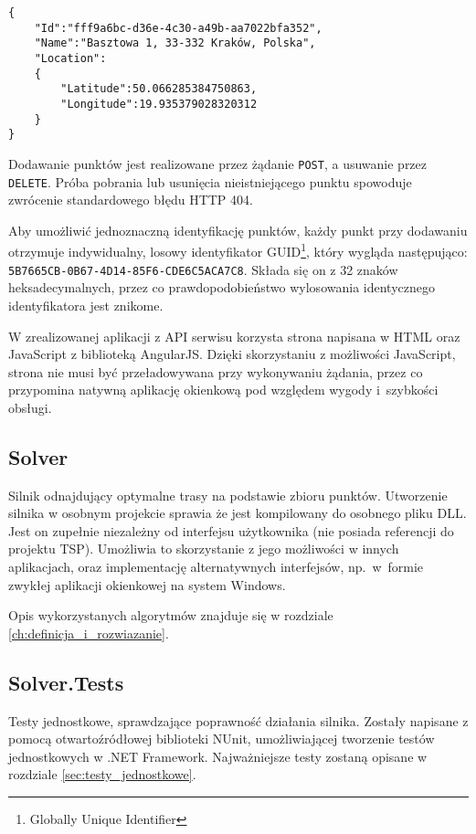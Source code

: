 \begin{verbatim}
{  
    "Id":"fff9a6bc-d36e-4c30-a49b-aa7022bfa352",
    "Name":"Basztowa 1, 33-332 Kraków, Polska",
    "Location": 
    {  
        "Latitude":50.066285384750863,
        "Longitude":19.935379028320312
    }
}
\end{verbatim}

Dodawanie punktów jest realizowane przez żądanie \texttt{POST}, a usuwanie przez \texttt{DELETE}. Próba pobrania lub usunięcia nieistniejącego punktu spowoduje zwrócenie standardowego błędu HTTP 404. 

Aby umożliwić jednoznaczną identyfikację punktów, każdy punkt przy dodawaniu otrzymuje indywidualny, losowy identyfikator GUID\footnote{Globally Unique Identifier}, który wygląda następująco: \texttt{5B7665CB-0B67-4D14-85F6-CDE6C5ACA7C8}. Składa się on z 32 znaków heksadecymalnych, przez co prawdopodobieństwo wylosowania identycznego identyfikatora jest znikome. 

W zrealizowanej aplikacji z API serwisu korzysta strona napisana w HTML oraz JavaScript z biblioteką AngularJS. Dzięki skorzystaniu z możliwości JavaScript, strona nie musi być przeładowywana przy wykonywaniu żądania, przez co przypomina natywną aplikację okienkową pod względem wygody i~szybkości obsługi.

\subsection*{Solver}

Silnik odnajdujący optymalne trasy na podstawie zbioru punktów. Utworzenie silnika w osobnym projekcie sprawia że jest kompilowany do osobnego pliku DLL. Jest on zupełnie niezależny od interfejsu użytkownika (nie posiada referencji do projektu TSP). Umożliwia to skorzystanie z jego możliwości w innych aplikacjach, oraz implementację alternatywnych interfejsów, np.~w~formie zwykłej aplikacji okienkowej na system Windows.

Opis wykorzystanych algorytmów znajduje się w rozdziale \ref{ch:definicja_i_rozwiazanie}.

\subsection*{Solver.Tests}

Testy jednostkowe, sprawdzające poprawność działania silnika. Zostały napisane z pomocą otwartoźródłowej biblioteki NUnit, umożliwiającej tworzenie testów jednostkowych w .NET Framework. Najważniejsze testy zostaną opisane w rozdziale \ref{sec:testy_jednostkowe}.